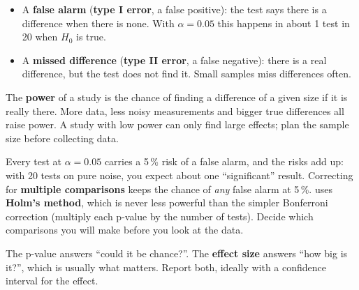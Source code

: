 
\begin{itemize}
  \item A \textbf{false alarm} (\textbf{type I error}, a false positive): the test says there is a
    difference when there is none. With $\alpha = 0.05$ this happens in about 1 test in 20 when
    $H_0$ is true.
  \item A \textbf{missed difference} (\textbf{type II error}, a false negative): there is a real
    difference, but the test does not find it. Small samples miss differences often.
\end{itemize}

The \textbf{power} of a study is the chance of finding a difference of a given size if it is
really there. More data, less noisy measurements and bigger true differences all raise power. A
study with low power can only find large effects; plan the sample size before collecting data.


Every test at $\alpha = 0.05$ carries a 5\,\% risk of a false alarm, and the risks add up: with 20
tests on pure noise, you expect about one ``significant'' result. Correcting for
\textbf{multiple comparisons} keeps the chance of \emph{any} false alarm at 5\,\%.
 uses \textbf{Holm's method}, which is never less powerful than the
simpler Bonferroni correction (multiply each p-value by the number of tests). Decide which
comparisons you will make before you look at the data.


The p-value answers ``could it be chance?''. The \textbf{effect size} answers ``how big is it?'',
which is usually what matters. Report both, ideally with a confidence interval for the effect.

